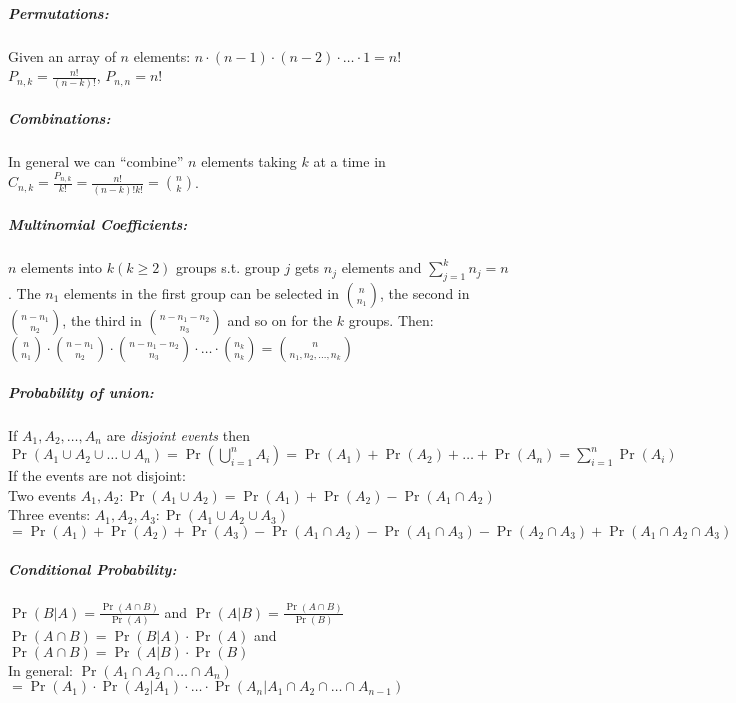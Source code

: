 \documentclass[landscape,10pt]{article}
\begin{document}
    \footnotesize
    \begin{multicols}{4}
    \setlength{\premulticols}{1pt}
    \setlength{\postmulticols}{1pt}
    \setlength{\multicolsep}{1pt}
    \setlength{\columnsep}{2pt}

    \subparagraph*{Permutations: } 
        Given an array of \(n\) elements: \(n \cdot (n-1) \cdot (n-2) \cdot \ldots \cdot 1 = n!\) \\
        \(P_{n,k} = \frac{n!}{(n-k)!}\), \(P_{n,n} = n!\)
        
    \subparagraph*{Combinations: }
        In general we can ``combine'' \(n\) elements taking \(k\) at a time in\\ \(C_{n,k} = \frac{P_{n,k}}{k!} = \frac{n!}{(n-k)!k!} = {n \choose k} \). 

    \subparagraph*{Multinomial Coefficients: } 
        \(n\) elements into \(k (k \geq 2)\) groups s.t. group \(j\) gets \(n_j\) elements and \(\sum_{j = 1}^{k}n_j = n\). The \(n_1\) elements in the first group can be selected in \({n \choose n_1}\), the second in \({n-n_1 \choose n_2}\), the third in \({n-n_1-n_2 \choose n_3}\) and so on for the \(k\) groups. Then:\\ \({n \choose n_1}\cdot{n-n_1 \choose n_2}\cdot{n-n_1-n_2 \choose n_3}\cdot \ldots \cdot{n_k \choose n_k} = {n \choose n_1, n_2, \ldots, n_k}\)

    \subparagraph*{Probability of union:}
        If \(A_1, A_2, \ldots, A_n\) are \textit{disjoint events} then \(\Pr(A_1 \cup A_2 \cup \ldots \cup A_n) = \Pr(\bigcup\limits_{i=1}^{n}A_i) = \Pr(A_1) + \Pr(A_2) + \ldots + \Pr(A_n) = \sum\limits_{i=1}^{n}\Pr(A_i) \)
        \smallskip
    If the events are not disjoint: \\
     Two events \(A_1, A_2: \Pr(A_1 \cup A_2) = \Pr(A_1) + \Pr(A_2) - \Pr(A_1 \cap A_2)\)\\
    Three events: \(A_1, A_2, A_3: \Pr(A_1 \cup A_2 \cup A_3)\)
    \(= \Pr(A_1) + \Pr(A_2) + \Pr(A_3) - \Pr(A_1 \cap A_2) - \Pr(A_1 \cap A_3) - \Pr(A_2 \cap A_3) + \Pr(A_1 \cap A_2 \cap A_3)\)
    
    \subparagraph*{Conditional Probability: }
    \(\Pr(B|A) = \frac{\Pr(A\cap B)}{\Pr(A)}\) and \(\Pr(A|B) = \frac{\Pr(A \cap B)}{\Pr(B)}\) \\
    \(\Pr(A \cap B) = \Pr(B|A) \cdot \Pr(A)\) and  \\
    \(\Pr(A \cap B) = \Pr(A|B) \cdot \Pr(B)\)  \\
    In general: \(\Pr(A_1 \cap A_2 \cap \ldots \cap A_n) \)\\
    \(= \Pr(A_1) \cdot \Pr(A_2 | A_1) \cdot \ldots \cdot \Pr(A_n | A_1 \cap A_2 \cap \ldots \cap A_{n-1})\)
    

\end{multicols}
\end{document}
